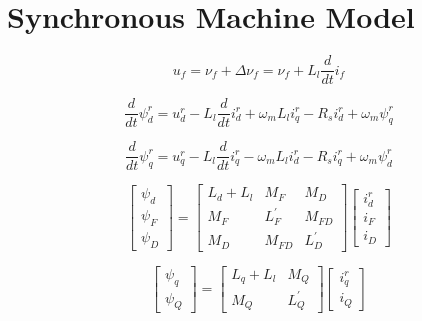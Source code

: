 \documentclass{article}
\begin{document}
\section{Synchronous Machine Model} 


\begin{equation}  \label{eq:sync1}
u_f = \nu_f + \Delta \nu_f = \nu_f + L_l \frac{d}{dt} i_f
\end{equation}


\begin{equation}  \label{eq:sync2}
\frac{d}{dt} \psi^r_d = u^r_d - L_l \frac{d}{dt} i^r_d + \omega_m L_l i^r_q - R_s i^r_d + \omega_m \psi^r_q
\end{equation}


\begin{equation}  \label{eq:sync3}
\frac{d}{dt} \psi^r_q = u^r_q - L_l \frac{d}{dt} i^r_q - \omega_m L_l i^r_d - R_s i^r_q + \omega_m \psi^r_d
\end{equation}


\begin{equation} \label{eq:sync4}
\begin{bmatrix}
\psi_d \\
\psi_F \\
\psi_D
\end{bmatrix}
= 
\begin{bmatrix}
L_d + L_l  &  M_F        &  M_D     \\
M_F        &  L^{'}_{F}  &  M_{FD}  \\
M_D        &  M_{FD}     &  L^{'}_D  
\end{bmatrix}
\begin{bmatrix}
i^r_d \\
i_F   \\
i_D   
\end{bmatrix}
\end{equation}

\begin{equation} \label{eq:sync5}
\begin{bmatrix}
\psi_q \\
\psi_Q
\end{bmatrix}
= 
\begin{bmatrix}
L_q + L_l  &  M_Q       \\   
M_Q        &  L^{'}_{Q}
\end{bmatrix}
\begin{bmatrix}
i^r_q \\
i_Q   
\end{bmatrix}
\end{equation}
\end{document}
